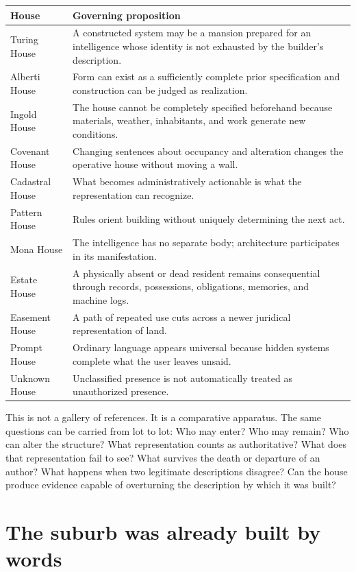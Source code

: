 \documentclass[11pt]{article}
\begin{document}
\begin{longtable}{p{} p{}}
\toprule
\textbf{House} & \textbf{Governing proposition}\\
\midrule
Turing House & A constructed system may be a mansion prepared for an intelligence whose identity is not exhausted by the builder's description.\\
Alberti House & Form can exist as a sufficiently complete prior specification and construction can be judged as realization.\\
Ingold House & The house cannot be completely specified beforehand because materials, weather, inhabitants, and work generate new conditions.\\
Covenant House & Changing sentences about occupancy and alteration changes the operative house without moving a wall.\\
Cadastral House & What becomes administratively actionable is what the representation can recognize.\\
Pattern House & Rules orient building without uniquely determining the next act.\\
Mona House & The intelligence has no separate body; architecture participates in its manifestation.\\
Estate House & A physically absent or dead resident remains consequential through records, possessions, obligations, memories, and machine logs.\\
Easement House & A path of repeated use cuts across a newer juridical representation of land.\\
Prompt House & Ordinary language appears universal because hidden systems complete what the user leaves unsaid.\\
Unknown House & Unclassified presence is not automatically treated as unauthorized presence.\\
\bottomrule
\end{longtable}

This is not a gallery of references. It is a comparative apparatus. The same questions can be carried from lot to lot: Who may enter? Who may remain? Who can alter the structure? What representation counts as authoritative? What does that representation fail to see? What survives the death or departure of an author? What happens when two legitimate descriptions disagree? Can the house produce evidence capable of overturning the description by which it was built?

\section{The suburb was already built by words}
\end{document}
